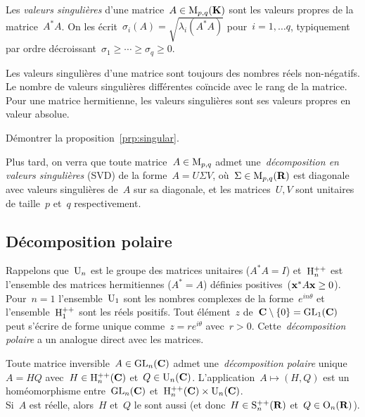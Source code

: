 \begin{definition}
	Les \emph{valeurs singulières} d'une matrice~$A\in\mathrm{M}_{p,q}(\mathbf{K})$ sont les
	valeurs propres de la matrice~$A^*A$.  On les
	écrit~$\sigma_i(A)=\sqrt{\lambda_i(A^*A)}$ pour~$i=1,\ldots q$,
	typiquement par ordre décroissant~$\sigma_1\ge\cdots\ge\sigma_q\ge0$.
\end{definition}

\begin{proposition}
	\label{prp:singular}
	Les valeurs singulières d'une matrice sont toujours des nombres réels
	non-négatifs.  Le nombre de valeurs singulières différentes coïncide avec
	le rang de la matrice.  Pour une matrice hermitienne, les valeurs
	singulières sont ses valeurs propres en valeur absolue.
\end{proposition}

\begin{exercice}
	Démontrer la proposition~\ref{prp:singular}.
\end{exercice}

Plus tard, on verra que toute matrice~$A\in\mathrm{M}_{p,q}$ admet
une~\emph{décomposition en valeurs singulières} (SVD) de la forme~$A=U\Sigma V$,
où~$\Sigma\in\mathrm{M}_{p,q}(\mathbf{R})$ est diagonale avec valeurs singulières de~$A$
sur sa diagonale, et les matrices~$U,V$ sont unitaires de taille~$p$ et~$q$
respectivement.


\subsection{Décomposition polaire}

Rappelons que~$\mathrm{U}_n$ est le groupe des matrices unitaires ($A^*A=I$)
et~$\mathrm{H}_n^{++}$ est l'ensemble des matrices hermitiennes ($A^*=A$) définies
positives~($\mathbf{x}^*A\mathbf{x}\ge 0$).  Pour~$n=1$ l'ensemble~$\mathrm{U}_1$ sont les nombres
complexes de la forme~$e^{in\theta}$ et l'ensemble~$\mathrm{H}_1^{++}$ sont les réels
positifs.  Tout élément~$z$ de~$\mathbf{C}\setminus\{0\}=\mathrm{GL}_1(\mathbf{C})$ peut s'écrire de
forme unique comme~$z=re^{i\theta}$ avec~$r>0$.  Cette~\emph{décomposition
polaire} a un analogue direct avec les matrices.

\begin{theorem}
	\label{thm:polaire}
	Toute matrice inversible~$A\in\mathrm{GL}_n(\mathbf{C})$ admet une~\emph{décomposition
	polaire}
	unique~$A=HQ$ avec~$H\in\mathrm{H}_n^{++}(\mathbf{C})$ et~$Q\in\mathrm{U}_n(\mathbf{C})$.
	L'application~$A\mapsto(H,Q)$ est un homéomorphisme entre~$\mathrm{GL}_n(\mathbf{C})$
	et~$\mathrm{H}_n^{++}(\mathbf{C})\times\mathrm{U}_n(\mathbf{C})$.\\
	Si~$A$ est réelle, alors~$H$ et~$Q$ le sont
	aussi (et donc~$H\in\mathrm{S}^{++}_n(\mathbf{R})$ et~$Q\in\mathrm{O}_n(\mathbf{R})$).
\end{theorem}

